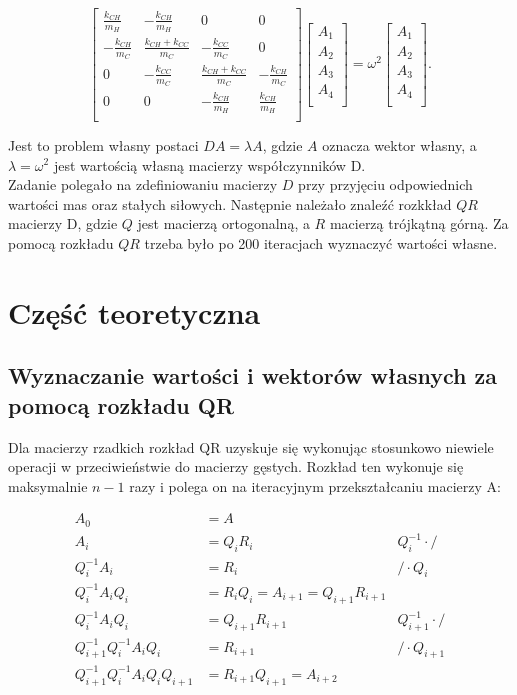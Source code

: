 \documentclass{article}
\begin{document}
\begin{equation}
\begin{bmatrix}
\frac{k_{CH}}{m_H} & -\frac{k_{CH}}{m_H} & 0 & 0 \\
-\frac{k_{CH}}{m_C} & \frac{k_{CH} + k_{CC}}{m_C} & -\frac{k_{CC}}{m_C} & 0 \\
0 & -\frac{k_{CC}}{m_C} & \frac{k_{CH} + k_{CC}}{m_C} & -\frac{k_{CH}}{m_C} \\
0 & 0 & -\frac{k_{CH}}{m_H} & \frac{k_{CH}}{m_H} \\
\end{bmatrix}
\begin{bmatrix}
A_1 \\
A_2 \\
A_3 \\
A_4 \\
\end{bmatrix}
= \omega^2
\begin{bmatrix}
A_1 \\
A_2 \\
A_3 \\
A_4 \\
\end{bmatrix}.
\end{equation}

\noindent
Jest to problem własny postaci $DA = \lambda A$, gdzie $A$ oznacza wektor własny, a $\lambda = \omega^2$ jest wartością własną macierzy współczynników D. \\
Zadanie polegało na zdefiniowaniu macierzy $D$ przy przyjęciu odpowiednich wartości mas oraz stałych siłowych. Następnie należało znaleźć rozkkład $QR$ macierzy D, gdzie $Q$ jest macierzą ortogonalną, a $R$ macierzą trójkątną górną. Za pomocą rozkładu $QR$
trzeba było po 200 iteracjach wyznaczyć wartości własne. 

\section{Część teoretyczna}

\subsection{Wyznaczanie wartości i wektorów własnych za pomocą rozkładu QR}
Dla macierzy rzadkich rozkład QR uzyskuje się wykonując stosunkowo niewiele operacji w przeciwieństwie do macierzy gęstych. Rozkład ten wykonuje się maksymalnie $n-1$ razy i polega on na iteracyjnym przekształcaniu macierzy A:

\begin{align*}
A_0 &= A \\
A_i &= Q_i R_i \quad &Q_i^{-1} \cdot / \\
Q_i^{-1} A_i &= R_i \quad &/ \cdot Q_i \\
Q_i^{-1} A_i Q_i &= R_i Q_i = A_{i+1} = Q_{i+1} R_{i+1} \\
Q_i^{-1} A_i Q_i &= Q_{i+1} R_{i+1} \quad &Q_{i+1}^{-1} \cdot / \\
Q_{i+1}^{-1} Q_i^{-1} A_i Q_i &= R_{i+1} \quad &/ \cdot Q_{i+1} \\
Q_{i+1}^{-1} Q_i^{-1} A_i Q_i Q_{i+1} &= R_{i+1} Q_{i+1} = A_{i+2}
\end{align*}
\end{document}
